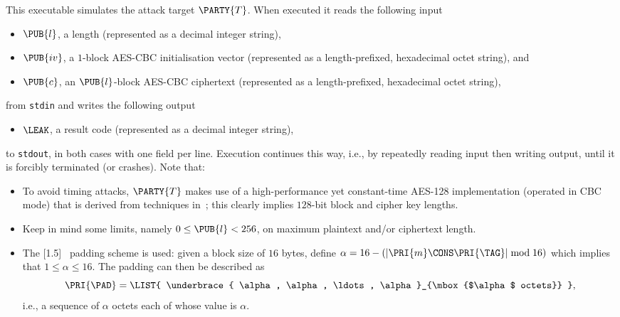 

This executable simulates the attack target $\PARTY{T}$.  When executed it 
reads the following input

\begin{itemize}
\item $\PUB{l}$,
      a  length
      (represented as a                       decimal integer string),
\item $\PUB{iv}$,
      a      ${1}$-block AES-CBC initialisation vector
      (represented as a  length-prefixed, hexadecimal octet   string),
      and
\item $\PUB{c}$,
      an $\PUB{l}$-block AES-CBC ciphertext
      (represented as a  length-prefixed, hexadecimal octet   string),
\end{itemize}

\noindent
from \lstinline[language={bash}]{stdin} and writes the following output

\begin{itemize}
\item $\LEAK$,
      a  result code
      (represented as a                       decimal integer string),
\end{itemize}

\noindent
to \lstinline[language={bash}]{stdout}, in both cases with one field per 
line.  Execution continues this way, i.e., by repeatedly reading input 
then writing output, until it is forcibly terminated (or crashes).  
Note that:

\begin{itemize}
\item To avoid timing attacks, $\PARTY{T}$ makes use of a high-performance
      yet constant-time AES-128 implementation (operated in CBC mode) that
      is derived from techniques in~\cite{SCALE:KasSch:09};
      this clearly implies $128$-bit block and cipher key lengths.  
\item Keep in mind some limits, namely $0 \leq \PUB{l} < 256$, on maximum
      plaintext and/or ciphertext length.
\item The [1.5]~\cite[Section 10.3]{SCALE:RFC:2315} padding scheme 
      is used: given a block size of $16$ bytes, define
      $
      \alpha = 16 - ( | \PRI{m} \CONS \PRI{\TAG} | \bmod 16 ) 
      $
      which implies that
      $
      1 \leq \alpha \leq 16 .
      $
      The padding can then be described as
      \[
      \PRI{\PAD} = \LIST{ \underbrace{ \alpha, \alpha, \ldots, \alpha }_{\mbox{$\alpha$ octets}} } ,
      \]
      i.e., a sequence of $\alpha$ octets each of whose value is $\alpha$.
\end{itemize}

